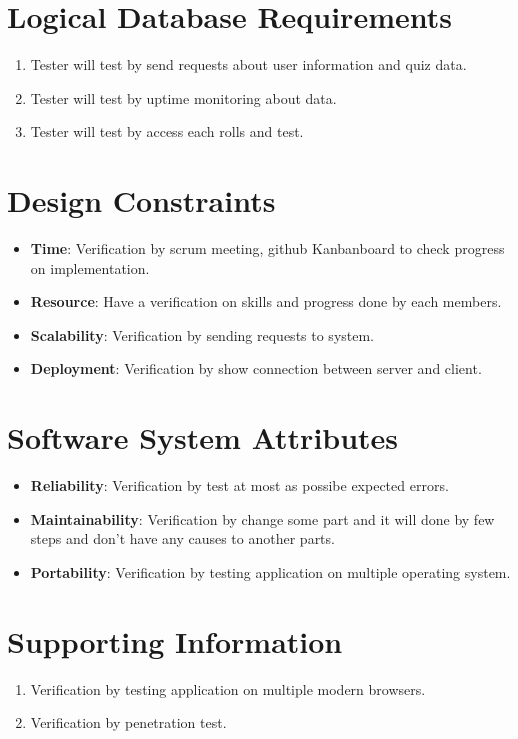 \documentclass[ 10pt]{report}
\begin{document}
        \section{Logical Database Requirements}
        \begin{enumerate}
            \item Tester will test by send requests about user information and quiz data.
            \item Tester will test by uptime monitoring about data.
            \item Tester will test by access each rolls and test.
        \end{enumerate}
        \section{Design Constraints}
        \begin{itemize}
            \item \textbf{Time}: Verification by scrum meeting, github Kanbanboard to check progress on implementation.
            \item \textbf{Resource}: Have a verification on skills and progress done by each members.
            \item \textbf{Scalability}: Verification by sending requests to system.
            \item \textbf{Deployment}: Verification by show connection between server and client.
        \end{itemize}
        \section{Software System Attributes}
        \begin{itemize}
            \item \textbf{Reliability}: Verification by test at most as possibe expected errors.
            \item \textbf{Maintainability}: Verification by change some part and it will done by few steps and don't have any causes to another parts.
            \item \textbf{Portability}: Verification by testing application on multiple operating system.
        \end{itemize}
        \section{Supporting Information}
        \begin{enumerate}
            \item Verification by testing application on multiple modern browsers.
            \item Verification by penetration test.
        \end{enumerate}
    \pagebreak
\end{document}
